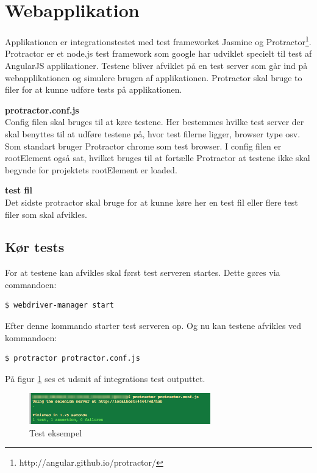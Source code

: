 \section{Webapplikation}
Applikationen er integrationstestet med test frameworket Jasmine og Protractor\footnote{http://angular.github.io/protractor/}. Protractor er et node.js test framework som google har udviklet specielt til test af AngularJS applikationer. Testene bliver afviklet på en test server som går ind på webapplikationen og simulere brugen af applikationen. Protractor skal bruge to filer for at kunne udføre tests på applikationen.\linebreak

\textbf{protractor.conf.js}\\
Config filen skal bruges til at køre testene. Her bestemmes hvilke test server der skal benyttes til at udføre testene på, hvor test filerne ligger, browser type osv. Som standart bruger Protractor chrome som test browser. I config filen er rootElement også sat, hvilket bruges til at fortælle Protractor at testene ikke skal begynde for projektets rootElement er loaded. 

\textbf{test fil}\\
Det sidste protractor skal bruge for at kunne køre her en test fil eller flere test filer som skal afvikles. 

\subsection{Kør tests}
For at testene kan afvikles skal først test serveren startes. Dette gøres via commandoen:

\begin{lstlisting}[language=bash]
	$ webdriver-manager start
\end{lstlisting}

Efter denne kommando starter test serveren op. Og nu kan testene afvikles ved kommandoen:

\begin{lstlisting}[language=bash]
	$ protractor protractor.conf.js
\end{lstlisting}

På figur \ref{fig:integration_exampel} ses et udsnit af integrations test outputtet.

\vspace{-5pt}
\begin{figure}[H]
	\centering
	\includegraphics[width=0.7\textwidth]{Billeder/Test/integration_web.png}
	\vspace{-5pt}
	\caption{Test eksempel}
	\label{fig:integration_exampel}
\end{figure}